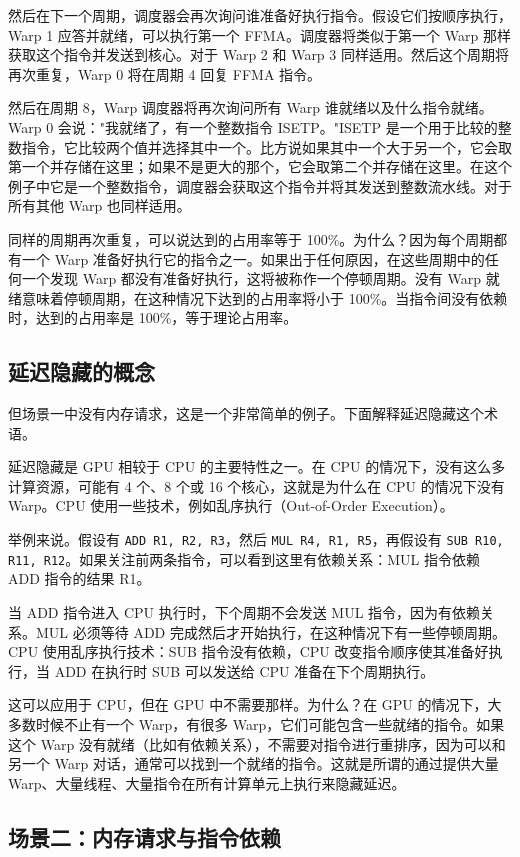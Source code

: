 然后在下一个周期，调度器会再次询问谁准备好执行指令。假设它们按顺序执行，Warp 1 应答并就绪，可以执行第一个 FFMA。调度器将类似于第一个 Warp 那样获取这个指令并发送到核心。对于 Warp 2 和 Warp 3 同样适用。然后这个周期将再次重复，Warp 0 将在周期 4 回复 FFMA 指令。

然后在周期 8，Warp 调度器将再次询问所有 Warp 谁就绪以及什么指令就绪。Warp 0 会说："我就绪了，有一个整数指令 ISETP。"ISETP 是一个用于比较的整数指令，它比较两个值并选择其中一个。比方说如果其中一个大于另一个，它会取第一个并存储在这里；如果不是更大的那个，它会取第二个并存储在这里。在这个例子中它是一个整数指令，调度器会获取这个指令并将其发送到整数流水线。对于所有其他 Warp 也同样适用。

同样的周期再次重复，可以说达到的占用率等于 100\%。为什么？因为每个周期都有一个 Warp 准备好执行它的指令之一。如果出于任何原因，在这些周期中的任何一个发现 Warp 都没有准备好执行，这将被称作一个停顿周期。没有 Warp 就绪意味着停顿周期，在这种情况下达到的占用率将小于 100\%。当指令间没有依赖时，达到的占用率是 100\%，等于理论占用率。

\subsection{延迟隐藏的概念}

但场景一中没有内存请求，这是一个非常简单的例子。下面解释延迟隐藏这个术语。

延迟隐藏是 GPU 相较于 CPU 的主要特性之一。在 CPU 的情况下，没有这么多计算资源，可能有 4 个、8 个或 16 个核心，这就是为什么在 CPU 的情况下没有 Warp。CPU 使用一些技术，例如乱序执行（Out-of-Order Execution）。

举例来说。假设有 \texttt{ADD R1, R2, R3}，然后 \texttt{MUL R4, R1, R5}，再假设有 \texttt{SUB R10, R11, R12}。如果关注前两条指令，可以看到这里有依赖关系：MUL 指令依赖 ADD 指令的结果 R1。

当 ADD 指令进入 CPU 执行时，下个周期不会发送 MUL 指令，因为有依赖关系。MUL 必须等待 ADD 完成然后才开始执行，在这种情况下有一些停顿周期。CPU 使用乱序执行技术：SUB 指令没有依赖，CPU 改变指令顺序使其准备好执行，当 ADD 在执行时 SUB 可以发送给 CPU 准备在下个周期执行。

这可以应用于 CPU，但在 GPU 中不需要那样。为什么？在 GPU 的情况下，大多数时候不止有一个 Warp，有很多 Warp，它们可能包含一些就绪的指令。如果这个 Warp 没有就绪（比如有依赖关系），不需要对指令进行重排序，因为可以和另一个 Warp 对话，通常可以找到一个就绪的指令。这就是所谓的通过提供大量 Warp、大量线程、大量指令在所有计算单元上执行来隐藏延迟。

\subsection{场景二：内存请求与指令依赖}

